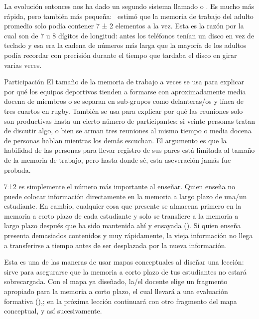 La evolución entonces nos ha dado un segundo sistema
llamado 
o .
Es mucho más rápida,
pero también más pequeña:~\cite{Mill1956} estimó que la memoria de trabajo del adulto promedio solo podía contener 7 ± 2 elementos a la vez.
Esta es la razón por la cual 
son de 7 u 8 dígitos de longitud:
antes los teléfonos tenían un disco en vez de teclado y
esa era la cadena de números más larga que la mayoría de los adultos podía recordar con precisión durante el tiempo que tardaba el disco en girar varias veces.

\begin{aside}{Participación}
  El tamaño de la memoria de trabajo a veces se usa para explicar por qué los equipos 
  deportivos tienden a formarse con aproximadamente media docena de miembros o
  se separan en sub-grupos como delanteras/os y línea de tres cuartos en rugby.
  También se usa para explicar por qué las reuniones solo son productivas hasta un cierto número de participantes:
si veinte personas tratan de discutir algo,
o bien se arman tres reuniones al mismo tiempo
o media docena de personas hablan mientras los demás escuchan.
El argumento es que la habilidad de las personas para llevar registro de sus pares está limitada al tamaño de la memoria de trabajo,
pero hasta donde sé,
esta aseveración jamás fue probada.
\end{aside}

7±2 es simplemente el número más importante al enseñar.
Quien enseña no puede colocar información directamente en la memoria a largo plazo de una/un estudiante.
En cambio,
cualquier cosa que presente se almacena primero en la memoria a corto plazo de cada estudiante
y solo se transfiere a la memoria a largo plazo después que ha sido mantenida ahí y ensayada ().
Si quien enseña presenta demasiados contenidos y muy rápidamente,
la vieja información no llega a transferirse a tiempo antes de ser desplazada por la nueva información.

Esta es una de las maneras de usar mapas conceptuales al diseñar una lección:
sirve para asegurarse que la memoria a corto plazo de tus estudiantes no estará sobrecargada.
Con el mapa ya diseñado,
la/el docente elige un fragmento apropiado para la memoria a corto plazo, el cual llevará a una evaluación formativa (),; en la próxima lección continuará con otro fragmento del mapa conceptual, y así sucesivamente.

